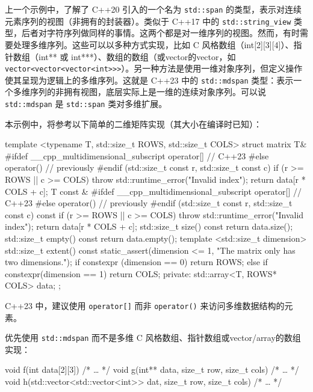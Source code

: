 
上一个示例中，了解了 C++20 引入的一个名为 \verb|std::span| 的类型，表示对连续元素序列的视图（非拥有的封装器）。类似于 C++17 中的 \verb|std::string_view| 类型，后者对字符序列做同样的事情。这两个都是对一维序列的视图。然而，有时需要处理多维序列。这些可以以多种方式实现，比如 C 风格数组（int[2][3][4]）、指针数组（int** 或 int***）、数组的数组（或vector的vector，如 \verb|vector<vector<vector<int>>>|）。另一种方法是使用一维对象序列，但定义操作使其呈现为逻辑上的多维序列。这就是 C++23 中的 \verb|std::mdspan| 类型：表示一个多维序列的非拥有视图，底层实际上是一维的连续对象序列。可以说 \verb|std::mdspan| 是 \verb|std::span| 类对多维扩展。


本示例中，将参考以下简单的二维矩阵实现（其大小在编译时已知）：

\begin{cpp}
template <typename T, std::size_t ROWS, std::size_t COLS>
struct matrix
{
    T&
    #ifdef __cpp_multidimensional_subscript
    operator[] // C++23
    #else
    operator() // previously
    #endif
    (std::size_t const r, std::size_t const c)
    {
        if (r >= ROWS || c >= COLS)
            throw std::runtime_error("Invalid index");
        return data[r * COLS + c];
    }
    T const &
    #ifdef __cpp_multidimensional_subscript
    operator[] // C++23
    #else
    operator() // previously
    #endif
    (std::size_t const r, std::size_t const c) const
    {
        if (r >= ROWS || c >= COLS)
            throw std::runtime_error("Invalid index");
        return data[r * COLS + c];
    }
    std::size_t size() const { return data.size(); }
    std::size_t empty() const { return data.empty(); }
    template <std::size_t dimension>
    std::size_t extent() const
    {
        static_assert(dimension <= 1,
                      "The matrix only has two dimensions.");
        if constexpr (dimension == 0) return ROWS;
        else if constexpr(dimension == 1) return COLS;
    }
    private:
    std::array<T, ROWS* COLS> data;
};
\end{cpp}

\begin{myTip}
C++23 中，建议使用 \verb|operator[]| 而非 \verb|operator()| 来访问多维数据结构的元素。
\end{myTip}


优先使用 \verb|std::mdspan| 而不是多维 C 风格数组、指针数组或vector/array的数组实现：

\begin{cpp}
void f(int data[2][3]) { /* … */ }
void g(int** data, size_t row, size_t cols) { /* … */ }
void h(std::vector<std::vector<int>> dat, size_t row, size_t cols)
{ /* … */ }
\end{cpp}


